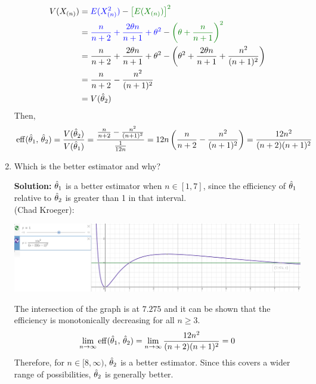 \begin{enumerate}[label=({\alph*})]
\begin{align*}
            V(X_{(n)}) &= \blu{E(X_{(n)}^2)} - \grn{\big[E(X_{(n)}) \big]^2} \\
            &= \blu{\frac{n}{n+2} + \frac{2\theta n}{n+1} + \theta^2} - \grn{\pars{\theta + \frac{n}{n+1}}^2}\\
            &= \frac{n}{n+2} + \frac{2\theta n}{n+1} +  \theta^2 - \pars{\theta^2 + \frac{2\theta n}{n+1} + \frac{n^2}{(n+1)^2}}\\
            &= \frac{n}{n+2}- \frac{n^2}{(n+1)^2}\\
            &= V(\that_2)
        \end{align*}
        Then,
        $$\operatorname{eff}(\hat{\theta}_1,\,\hat{\theta}_2) = \frac{V(\hat{\theta}_2)}{V(\hat{\theta}_1)} = \frac{\frac{n}{n+2}- \frac{n^2}{(n+1)^2}}{\frac{1}{{12n}}} = 12n \left( {\frac{n}{n+2}- \frac{n^2}{(n+1)^2}} \right) = \frac{12n^2}{(n+2)(n+1)^2}$$

    \vspace{2in}
    \item Which is the better estimator and why?
    
    \nl \textbf{Solution: } $\hat{\theta}_1$ is a better estimator when $n \in [1,7]$, since the efficiency of $\hat{\theta}_1$ relative to $\hat{\theta}_2$ is greater than 1 in that interval. \\ (Chad Kroeger):
    \begin{center}
    \includegraphics[width=6in]{graph.PNG}
    \end{center}
    The intersection of the graph is at $7.275$ and it can be shown that the efficiency is monotonically decreasing for all $n \geq 3$.
        $$\lim_{n\to\infty}\operatorname{eff}(\hat{\theta}_1,\,\hat{\theta}_2) = \lim_{n\to\infty} \frac{12n^2}{(n+2)(n+1)^2} = 0$$
    Therefore, for $n \in [8, \infty)$, $\hat{\theta}_2$ is a better estimator. Since this covers a wider range of possibilities,  $\hat{\theta}_2$ is generally better.
\end{enumerate}